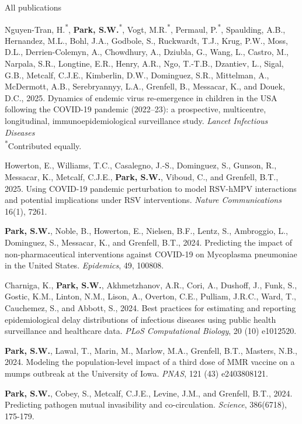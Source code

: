 \documentclass[
	11pt, %
]{resume} %
\begin{document}
\begin{rSection}{All publications}

Nguyen-Tran, H.\textsuperscript{*}, \textbf{Park, S.W.}\textsuperscript{*}, Vogt, M.R.\textsuperscript{*}, Permaul, P.\textsuperscript{*}, Spaulding, A.B., Hernandez, M.L., Bohl, J.A., Godbole, S., Ruckwardt, T.J., Krug, P.W., Moss, D.L., Derrien-Colemyn, A., Chowdhury, A., Dziubla, G., Wang, L., Castro, M., Narpala, S.R., Longtine, E.R., Henry, A.R., Ngo, T.-T.B., Dzantiev, L., Sigal, G.B., Metcalf, C.J.E., Kimberlin, D.W., Dominguez, S.R., Mittelman, A., McDermott, A.B., Serebryannyy, L.A., Grenfell, B., Messacar, K., and Douek, D.C., 2025. Dynamics of endemic virus re-emergence in children in the USA following the COVID-19 pandemic (2022–23): a prospective, multicentre, longitudinal, immunoepidemiological surveillance study. \textit{Lancet Infectious Diseases}\\
\textsuperscript{*}Contributed equally.

Howerton, E., Williams, T.C., Casalegno, J.-S., Dominguez, S., Gunson, R., Messacar, K., Metcalf, C.J.E., \textbf{Park, S.W.}, Viboud, C., and Grenfell, B.T., 2025. Using COVID-19 pandemic perturbation to model RSV-hMPV interactions and potential implications under RSV interventions. \textit{Nature Communications} 16(1), 7261. 

\textbf{Park, S.W.}, Noble, B., Howerton, E., Nielsen, B.F., Lentz, S., Ambroggio, L., Dominguez, S., Messacar, K., and Grenfell, B.T., 2024. Predicting the impact of non-pharmaceutical interventions against COVID-19 on Mycoplasma pneumoniae in the United States. \textit{Epidemics}, 49, 100808.

Charniga, K., \textbf{Park, S.W.}, Akhmetzhanov, A.R., Cori, A., Dushoff, J., Funk, S., Gostic, K.M., Linton, N.M., Lison, A., Overton, C.E., Pulliam, J.R.C., Ward, T., Cauchemez, S., and Abbott, S., 2024. Best practices for estimating and reporting epidemiological delay distributions of infectious diseases using public health surveillance and healthcare data. \textit{PLoS Computational Biology}, 20 (10) e1012520.

\textbf{Park, S.W.}, Lawal, T., Marin, M., Marlow, M.A., Grenfell, B.T., Masters, N.B., 2024. Modeling the population-level impact of a third dose of MMR vaccine on a mumps outbreak at the University of Iowa. \textit{PNAS}, 121 (43) e2403808121.

\textbf{Park, S.W.}, Cobey, S., Metcalf, C.J.E., Levine, J.M., and Grenfell, B.T., 2024. Predicting pathogen mutual invasibility and co-circulation. \textit{Science}, 386(6718), 175-179.


\end{rSection}
\end{document}
